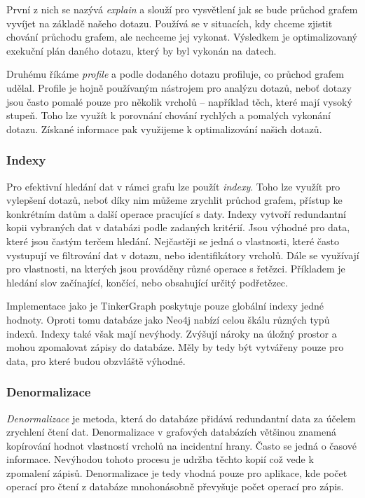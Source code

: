 \documentclass[
  program=infoi,
  biblatex=true,
  sourcecodes=true,
  figures=true,
  glossaries=false,
  index
]{kidiplom}
\begin{document}
První z nich se nazývá \textit{explain} a slouží pro vysvětlení jak se bude průchod grafem vyvíjet na základě našeho dotazu. Používá se v situacích, kdy chceme zjistit chování průchodu grafem, ale nechceme jej vykonat. Výsledkem je optimalizovaný exekuční plán daného dotazu, který by byl vykonán na datech.

Druhému říkáme \textit{profile} a podle dodaného dotazu profiluje, co průchod grafem udělal. Profile je hojně používaným nástrojem pro analýzu dotazů, neboť dotazy jsou často pomalé pouze pro několik vrcholů -- například těch, které mají vysoký stupeň. Toho lze využít k porovnání chování rychlých a pomalých vykonání dotazu. Získané informace pak využijeme k optimalizování našich dotazů.

\subsubsection{Indexy}
Pro efektivní hledání dat v rámci grafu lze použít \textit{indexy}. Toho lze využít pro vylepšení dotazů, neboť díky nim můžeme zrychlit průchod grafem, přístup ke konkrétním datům a další operace pracující s daty. Indexy vytvoří redundantní kopii vybraných dat v databázi podle zadaných kritérií. Jsou výhodné pro data, které jsou častým terčem hledání. Nejčastěji se jedná o vlastnosti, které často vystupují ve filtrování dat v dotazu, nebo identifikátory vrcholů. Dále se využívají pro vlastnosti, na kterých jsou prováděny různé operace s řetězci. Příkladem je hledání slov začínající, končící, nebo obsahující určitý podřetězec.

Implementace jako je TinkerGraph poskytuje pouze globální indexy jedné hodnoty. Oproti tomu databáze jako Neo4j nabízí celou škálu různých typů indexů. Indexy také však mají nevýhody. Zvýšují nároky na úložný prostor a mohou zpomalovat zápisy do databáze. Měly by tedy být vytvářeny pouze pro data, pro které budou obzvláště výhodné.

\subsubsection{Denormalizace}
\textit{Denormalizace} je metoda, která do databáze přidává redundantní data za účelem zrychlení čtení dat. Denormalizace v grafových databázích většinou znamená kopírování hodnot vlastností vrcholů na incidentní hrany. Často se jedná o časové informace. Nevýhodou tohoto procesu je udržba těchto kopií což vede k zpomalení zápisů. Denormalizace je tedy vhodná pouze pro aplikace, kde počet operací pro čtení z databáze mnohonásobně převyšuje počet operací pro zápis.
\end{document}
